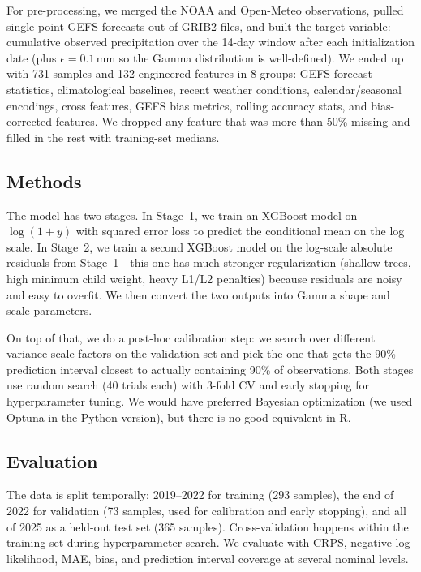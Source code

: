 \documentclass[11pt]{article}
\begin{document}
For pre-processing, we merged the NOAA and Open-Meteo observations, pulled single-point GEFS forecasts out of GRIB2 files, and built the target variable: cumulative observed precipitation over the 14-day window after each initialization date (plus $\epsilon = 0.1$\,mm so the Gamma distribution is well-defined). We ended up with 731 samples and 132 engineered features in 8 groups: GEFS forecast statistics, climatological baselines, recent weather conditions, calendar/seasonal encodings, cross features, GEFS bias metrics, rolling accuracy stats, and bias-corrected features. We dropped any feature that was more than 50\% missing and filled in the rest with training-set medians.

\subsection{Methods}

The model has two stages. In Stage~1, we train an XGBoost model on $\log(1+y)$ with squared error loss to predict the conditional mean on the log scale. In Stage~2, we train a second XGBoost model on the log-scale absolute residuals from Stage~1---this one has much stronger regularization (shallow trees, high minimum child weight, heavy L1/L2 penalties) because residuals are noisy and easy to overfit. We then convert the two outputs into Gamma shape and scale parameters.

On top of that, we do a post-hoc calibration step: we search over different variance scale factors on the validation set and pick the one that gets the 90\% prediction interval closest to actually containing 90\% of observations. Both stages use random search (40 trials each) with 3-fold CV and early stopping for hyperparameter tuning. We would have preferred Bayesian optimization (we used Optuna in the Python version), but there is no good equivalent in R.

\subsection{Evaluation}

The data is split temporally: 2019--2022 for training (293 samples), the end of 2022 for validation (73 samples, used for calibration and early stopping), and all of 2025 as a held-out test set (365 samples). Cross-validation happens within the training set during hyperparameter search. We evaluate with CRPS, negative log-likelihood, MAE, bias, and prediction interval coverage at several nominal levels.
\end{document}
